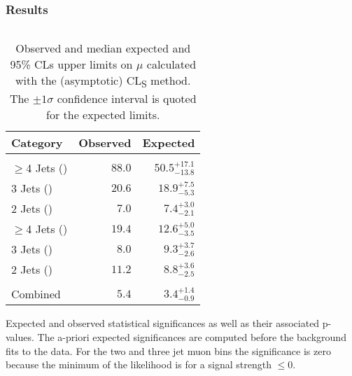 \begin{frame}
	\frametitle{Results}
	\vspace*{-0.24cm}
	\begin{columns}[T]
		\begin{column}{0.6\textwidth}
			\vspace*{-0.6cm}
			\begin{table}[htbp]
				\color{black}
				\caption*{\scriptsize Observed and median expected and 95\% CLs upper limits on $\mu$ calculated with the (asymptotic) CL\textsubscript{S} method. The $\pm1\sigma$ confidence interval is quoted for the expected limits.}
				\label{tab:95percent_upper_confidence_levels}
				\centering
				\scriptsize
				\vspace*{-0.15cm}
				\begin{tabular}{|l|r|r|} \hline
					\textbf{Category}                   & \textbf{Observed} & \textbf{Expected} \\
					\hline\\[-2.55ex]
					$\geqslant$4 Jets (\Pe)             & $88.0$   & $50.5_{-13.8}^{+17.1}$ \\
					3 Jets (\Pe)                        & $20.6$   & $18.9_{-5.3}^{+7.5}$   \\
					2 Jets (\Pe)                        & $7.0$    & $7.4_{-2.1}^{+3.0}$    \\
					$\geqslant$4 Jets (\Pmu)            & $19.4$   & $12.6_{-3.5}^{+5.0}$   \\
					3 Jets (\Pmu)                       & $8.0$    & $9.3_{-2.6}^{+3.7}$    \\
					2 Jets (\Pmu)                       & $11.2$   & $8.8_{-2.5}^{+3.6}$    \\
					\hline\\[-2.55ex]
					Combined                            & $5.4$   & $3.4_{-0.9}^{+1.4}$     \\
					\hline
				\end{tabular}
			\end{table}
			\vspace*{-0.2cm}
			\begin{table}[htbp]
				\color{black}
				\label{tab:significances_and_pvalues}
				\caption*{\scriptsize Expected and observed statistical significances as well as their associated p-values. The a-priori expected significances are computed before the background fits to the data. For the two and three jet muon bins the significance is zero because the minimum of the likelihood is for a signal strength $\leqslant0$.}
				\centering

\end{table}
\end{column}
\end{columns}
\end{frame}
